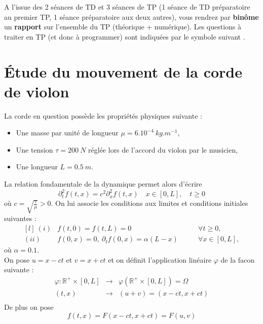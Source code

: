 \documentclass[12pt]{article}
\begin{document}
A l’issue des 2 séances de TD et 3 séances de TP (1 séance de TD préparatoire au premier TP,
1 séance préparatoire aux deux autres), vous rendrez par \textbf{binôme} un \textbf{rapport} sur l’ensemble
du TP (théorique + numérique). Les questions à traiter en TP (et donc à programmer) sont
indiquées par le symbole suivant  .

\section{\'Etude du mouvement de la corde de violon}
La corde en question possède les propriétés physiques suivante : \\
\begin{itemize}
\item Une masse par unité de longueur $\mu = 6.10^{-4} \ kg.m^{-1}$,
\item Une tension $\tau=200 \ N$ réglée lors de l'accord du violon par le musicien,
\item Une longueur $L=0.5 \ m$. \\
\end{itemize}
La relation fondamentale de la dynamique permet alors d'écrire
\begin{equation}
\label{eqn:d2tftx}
	\partial^{2}_{t} f(t,x)=c^2\partial^{2}_{x} f(t,x) \quad x \in [0,L], \quad t \geq 0
\end{equation}
où $c=\sqrt{\frac{\tau}{\mu}}>0$. On lui associe les conditions aux limites et conditions initiales suivantes :
\begin{equation}
\label{eqn:conditionsftx}
	\begin{matrix*}[l]
		\ (i)	&f(t,0)=f(t,L)=0 									&\forall t \geq 0, \\
		(ii) 	&f(0,x)=0, \ \partial_{t}f(0,x)=\alpha(L-x)\qquad 	&\forall x \in [0,L],
	\end{matrix*}
\end{equation} 
où $\alpha=0.1$. \\
On pose $u=x-ct$ et $v=x+ct$ et on définit l'application linéaire $\varphi$ de la facon suivante :
\[
\begin{matrix}
\varphi:\mathbb{R}^{+}\times [0,L] & \rightarrow & \varphi(\mathbb{R}^{+}\times [0,L])=\Omega \\
(t,x) & \rightarrow & (u+v)=(x-ct,x+ct) \\
\end{matrix}
\]
De plus on pose
\begin{equation}
\label{eqn:ftx}
f(t,x)=F(x-ct,x+ct)=F(u,v)
\end{equation}
\newpage
\end{document}

